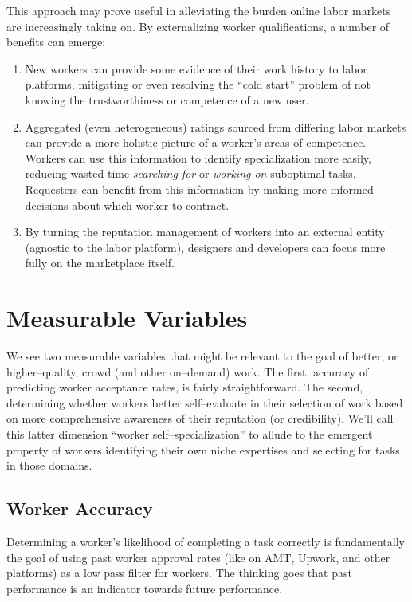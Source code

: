 \documentclass[11pt]{article}
\begin{document}
This approach may prove useful in
alleviating the burden online labor markets are increasingly taking on.
By externalizing worker qualifications, a number of benefits can emerge:
\begin{enumerate}
  \item New workers can provide some evidence of their work history to labor platforms,
        mitigating or even resolving the ``cold start'' problem of
        not knowing the trustworthiness or competence of a new user.
  \item Aggregated (even heterogeneous)
        ratings sourced from differing labor markets can provide
        a more holistic picture of a worker's areas of competence.
        Workers can use this information to identify specialization more easily,
        reducing wasted time \textit{searching for} or \textit{working on} suboptimal tasks.
        Requesters can benefit from this information by
        making more informed decisions about which worker to contract.
  \item By turning the reputation management of workers into an external entity
        (agnostic to the labor platform),
        designers and developers can focus more fully on the marketplace itself.
\end{enumerate}


\section*{Measurable Variables}
We see two measurable variables that might be relevant to
the goal of better, or higher--quality, crowd (and other on--demand) work.
The first, accuracy of predicting worker acceptance rates, is fairly straightforward.
The second, determining whether workers better self--evaluate in their selection of work
based on more comprehensive awareness of their reputation (or credibility).
We'll call this latter dimension ``worker self--specialization'' to allude to
the emergent property of workers identifying their own niche expertises and
selecting for tasks in those domains.

\subsection*{Worker Accuracy}
Determining a worker's likelihood of completing a task correctly is
fundamentally the goal of using past worker approval rates
(like on AMT, Upwork, and other platforms)
as a low pass filter for workers.
The thinking goes that past performance is an indicator towards future performance.
\end{document}

